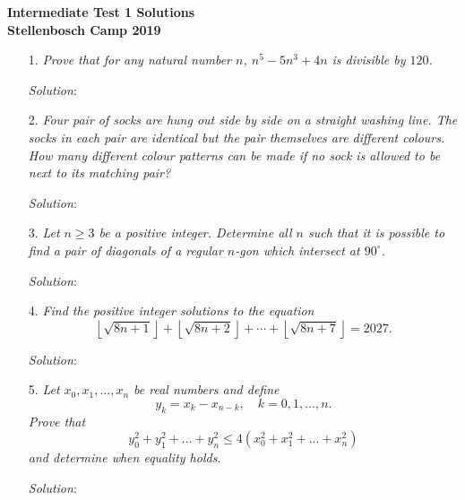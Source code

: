 \documentclass{article}
\begin{document}
\begin{center}
  \textbf{\Large Intermediate Test 1 Solutions}
  \\ \vspace{1em}
  \textbf{\large Stellenbosch Camp 2019}
\end{center}


\begin{enumerate}[1.]

\item[1.] %
\textit{Prove that for any natural number $n$, $n^5-5n^3+4n$ is divisible by $120$. }

\textit{Solution}:


\item[2.] %
\textit{Four pair of socks are hung out side by side on a straight washing line.
The socks in each pair are identical but the pair themselves are different colours.
How many different colour patterns can be made if no sock is allowed to be next to its matching pair?
}

\textit{Solution}:


\item[3.] %
\textit{Let $n\geq3$ be a positive integer.
Determine all $n$ such that it is possible to find a pair of diagonals of a regular $n$-gon which intersect at $90^\circ$.}

\textit{Solution}:


\item[4.] %
\newcommand{\floorsqrt}[1]{\left\lfloor\sqrt{#1}\right\rfloor} 
\textit{
Find the positive integer solutions to the equation
\[ \floorsqrt{8n+1} +\floorsqrt{8n+2} +\dotsb +\floorsqrt{8n+7} = 2027. \]}

\textit{Solution}:


\item[5.] %
\textit{
Let $x_0, x_1,..., x_n$ be real numbers and define
\[y_k=x_k-x_{n-k}, \quad k=0,1,...,n.\]
Prove that 
\[y_0^2+ y_1^2+...+ y_n^2 \leq 4(x_0^2 + x_1^2 + ... + x_n^2) \]
and determine when equality holds.
}

\textit{Solution}: 

\end{enumerate}
\end{document}
